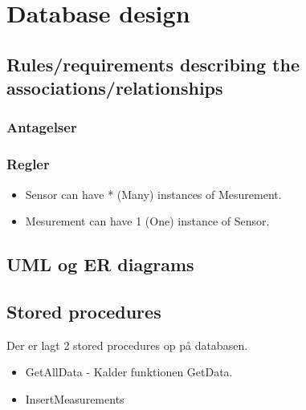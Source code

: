 \section{Database design}

\subsection{Rules/requirements describing the associations/relationships}

\subsubsection{Antagelser}

\subsubsection{Regler}

\begin{itemize}
	\item Sensor can have * (Many) instances of Mesurement.
	\item Mesurement can have 1 (One) instance of Sensor.
\end{itemize}

\subsection{UML og ER diagrams}


\subsection{Stored procedures}
Der er lagt 2 stored procedures op på databasen.

\begin{itemize}
	\item GetAllData - Kalder funktionen GetData.
	\item InsertMeasurements
\end{itemize}
